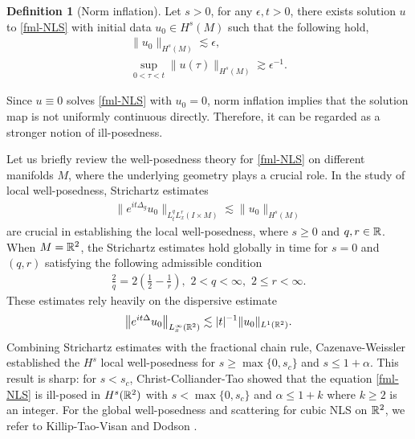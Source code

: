 \documentclass[11pt, reqno]{amsart}
\numberwithin{equation}{section}
\newcommand{\R}{\Bbb R}
\theoremstyle{definition}
\newtheorem{definition}[theorem]{Definition}
\theoremstyle{remark}
\begin{document}
\begin{definition}[Norm inflation]\label{def-strong-ill-posedness}
Let $s>0$, for any $\epsilon,t>0$, there exists solution $u$ to \eqref{fml-NLS} with initial data $u_0\in H^s(M)$ such that the following hold,
\begin{equation*}
\begin{gathered}
\|u_0\|_{H^s(M)} \lesssim \epsilon,\\
\sup_{0<\tau<t}\|u(\tau)\|_{H^s(M)} \gtrsim \epsilon^{-1}.
\end{gathered}
\end{equation*}
\end{definition}
	
Since $u\equiv 0$ solves \eqref{fml-NLS} with $u_0=0$, norm inflation implies that the solution map is not uniformly continuous directly. Therefore, it can be regarded as a stronger notion of ill-posedness.
	
	
Let us briefly review the well-posedness theory for \eqref{fml-NLS} on different manifolds $M$, where the underlying geometry plays a crucial role. In the study of local well-posedness, Strichartz estimates  
\begin{align}\label{Strichartz}
\big\|e^{it\Delta_g}u_0\big\|_{L_t^qL_x^r(I\times M)}\lesssim \|u_0\|_{H^s(M)}
\end{align} 
are crucial in establishing the local well-posedness, where $s\geq0$ and $q,r\in\R$. When $M=\R^2$, the Strichartz estimates hold  globally in time  for $s=0$ and $(q,r)$ satisfying the following admissible condition
\begin{align}\label{admissible}
\frac{2}{q}=2\left(\frac12-\frac1r\right),\,\,2<q<\infty,\,\,2\leq  r<\infty.
\end{align}  
These estimates rely heavily on the dispersive estimate
\begin{align*}
\big\|e^{it\Delta}u_0\big\|_{L_x^\infty(\R^2)}\lesssim|t|^{-1}\|u_0\|_{L^1(\R^2)}.
\end{align*}
Combining Strichartz estimates   with the fractional chain rule, Cazenave-Weissler  \cite{Caze} established the $ H^{s}$ local well-posedness for $s\geq \max\{0,s_c\}$ and $s\leq 1+\alpha$.   This result is sharp: for $s < s_c$, Christ-Colliander-Tao \cite{CCT-03} showed that the equation \eqref{fml-NLS} is  ill-posed in $H^s(\R^2)$ with $s<\max\{0,s_c\}$ and $\alpha \leq 1+k$ where $k\geq2$ is an integer. For the global well-posedness and scattering for cubic NLS on $\R^2$, we refer to Killip-Tao-Visan \cite{KVZ-JEMS} and Dodson \cite{Dodson}.
	
\end{document}
